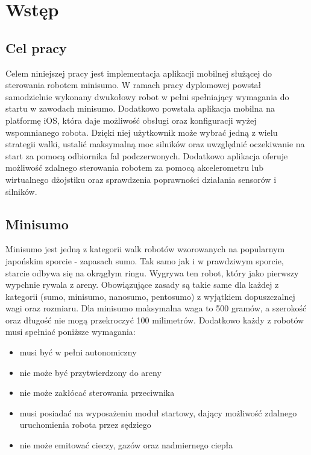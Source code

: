 \chapter{Wstęp}
\section{Cel pracy}
Celem niniejszej pracy jest implementacja aplikacji mobilnej służącej do sterowania robotem minisumo. W ramach pracy dyplomowej powstał samodzielnie wykonany dwukołowy robot w pełni spełniający wymagania do startu w zawodach minisumo. Dodatkowo powstała aplikacja mobilna na platformę iOS, która daje możliwość obsługi oraz konfiguracji wyżej wspomnianego robota. Dzięki niej użytkownik może wybrać jedną z wielu strategii walki, ustalić maksymalną moc silników oraz uwzględnić oczekiwanie na start za pomocą odbiornika fal podczerwonych. Dodatkowo aplikacja oferuje możliwość zdalnego sterowania robotem za pomocą akcelerometru lub wirtualnego dżojstiku oraz sprawdzenia poprawności działania sensorów i silników. 

\section{Minisumo}
Minisumo jest jedną z kategorii walk robotów wzorowanych na popularnym japońskim sporcie - zapasach sumo. Tak samo jak i w prawdziwym sporcie, starcie odbywa się na okrągłym ringu. Wygrywa ten robot, który jako pierwszy wypchnie rywala z areny. Obowiązujące zasady są takie same dla każdej z kategorii (sumo, minisumo, nanosumo, pentosumo) z wyjątkiem dopuszczalnej wagi oraz rozmiaru. Dla minisumo maksymalna waga to 500 gramów, a szerokość oraz długość nie mogą przekroczyć 100 milimetrów. Dodatkowo każdy z robotów musi spełniać 
poniższe wymagania:
\begin{itemize}
\item musi być w pełni autonomiczny
\item nie może być przytwierdzony do areny
\item nie może zakłócać sterowania przeciwnika
\item musi posiadać na wyposażeniu moduł startowy, dający możliwość zdalnego uruchomienia robota przez sędziego
\item nie może emitować cieczy, gazów oraz nadmiernego ciepła
\end{itemize}


